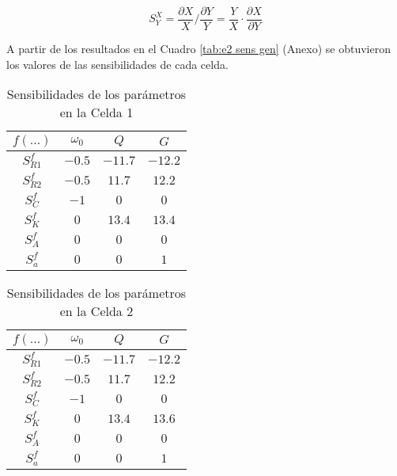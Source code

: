 \begin{equation}
S_{Y}^{X} = \frac{\partial X}{X} / \frac{\partial Y}{Y}= \frac{Y}{X} \cdot \frac{\partial X}{\partial Y}
\label{eq:e2 sensibilidad}
\end{equation}

A partir de los resultados en el Cuadro \ref{tab:e2 sens gen} (Anexo) se obtuvieron los valores de las sensibilidades de cada celda.

\begin{table}[ht]
\begin{center}
\begin{tabular}{||c|c|c|c||}
\hline
$f(...)$			&	$\omega_0$	&	$Q$	&	$G$	\\
\hline
\hline
$S_{R1}^f$	&	$-0.5$			&	$-11.7 $	&	$-12.2 $	\\
\hline
$S_{R2}^f$	&	$-0.5$			&	$11.7$	&	$12.2$	\\
\hline
$S_{C}^f$		&	$-1$				&	$0$	&	$0$	\\
\hline
$S_{K}^f$		&	$0$				&	$13.4$	&	$13.4$	\\
\hline
$S_{A}^f$		&	$0$				&	$0$	&	$0$	\\
\hline
$S_{a}^f$		&	$0$				&	$0$	&	$1$	\\
\hline
\end{tabular}
\caption{Sensibilidades de los parámetros en la Celda 1}
\label{tab:e2 sens 1}
\end{center}
\end{table}

\begin{table}[ht]
\begin{center}
\begin{tabular}{||c|c|c|c||}
\hline
$f(...)$			&	$\omega_0$	&	$Q$		&	$G$		\\
\hline
\hline
$S_{R1}^f$	&	$-0.5$			&	$-11.7$	&	$-12.2$	\\
\hline
$S_{R2}^f$	&	$-0.5$			&	$11.7$	&	$12.2$	\\
\hline
$S_{C}^f$		&	$-1$				&	$0$		&	$0$		\\
\hline
$S_{K}^f$		&	$0$				&	$13.4$	&	$13.6$	\\
\hline
$S_{A}^f$		&	$0$				&	$0$		&	$0$		\\
\hline
$S_{a}^f$		&	$0$				&	$0$		&	$1$		\\
\hline
\end{tabular}
\caption{Sensibilidades de los parámetros en la Celda 2}
\label{tab:e2 sens 2}
\end{center}
\end{table}

